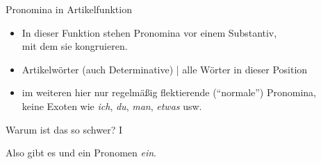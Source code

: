 \begin{frame}
  {Pronomina in Artikelfunktion}
  \pause
  \begin{exe}
    \ex \label{ex:gemeinsamkeitenundunterschiede074}
    \begin{xlist}
    \end{xlist}
  \end{exe}
  \pause
  \Zeile
  \begin{itemize}[<+->]
    \item In dieser Funktion stehen Pronomina \alert{vor einem Substantiv,\\
      mit dem sie kongruieren}.
      \Halbzeile
    \item \alert{Artikelwörter} (auch Determinative) | alle Wörter in dieser Position
      \Halbzeile
    \item im weiteren hier nur regelmäßig flektierende ("`normale"') Pronomina,\\
      keine Exoten wie \textit{ich}, \textit{du}, \textit{man}, \textit{etwas} usw.
  \end{itemize}
\end{frame}


\begin{frame}
  {Warum ist das so schwer? I}
  \pause
    \begin{center}
    \end{center}
    \pause
    \pause
    \Halbzeile
    Also gibt es  und \alert{ein Pronomen \textit{ein}}.
\end{frame}


